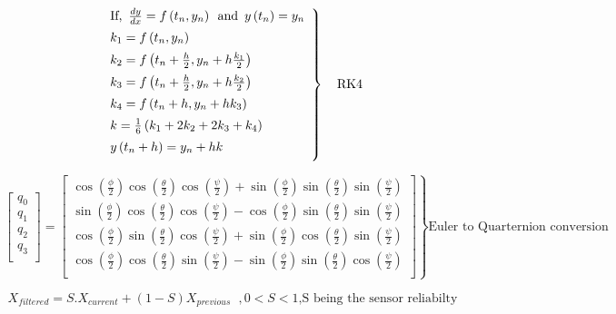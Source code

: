 \begin{equation}\label{rk4}
	\left.
	\begin{array}{lll}
		\vspace{5pt}\text{If,}\hspace{5pt}\frac{dy}{dx} = f\left(t_n,y_n\right)\hspace{5pt}\text{and}\hspace{5pt}y\left(t_n\right) = y_n\\
		\vspace{5pt}k_1 = f\left(t_n,y_n\right)\\
		\vspace{5pt}k_2 = f\left(t_n + \frac{h}{2},y_n + h\frac{k_1}{2}\right)\\
		\vspace{5pt}k_3 = f\left(t_n + \frac{h}{2},y_n + h\frac{k_2}{2}\right)\\
		\vspace{5pt}k_4 = f\left(t_n + h,y_n + hk_3\right)\\
		\vspace{5pt}k = \frac{1}{6}\left(k_1 + 2k_2 + 2k_3 + k_4\right)\\
		\vspace{5pt}y\left(t_n + h\right) = y_n + hk\\
	\end{array}
	\right \} \hspace{10pt}\text{RK4}
\end{equation}

\begin{equation}\label{euler2quart}
	\left.
	\begin{bmatrix}
		q_0\\
		q_1\\
		q_2\\
		q_3\\
	\end{bmatrix}
	= \begin{bmatrix}
		\cos\left(\frac{\phi}{2}\right)\cos\left(\frac{\theta}{2}\right)\cos\left(\frac{\psi}{2}\right)+\sin\left(\frac{\phi}{2}\right)\sin\left(\frac{\theta}{2}\right)\sin\left(\frac{\psi}{2}\right)\\
		\sin\left(\frac{\phi}{2}\right)\cos\left(\frac{\theta}{2}\right)\cos\left(\frac{\psi}{2}\right)-\cos\left(\frac{\phi}{2}\right)\sin\left(\frac{\theta}{2}\right)\sin\left(\frac{\psi}{2}\right)\\
		\cos\left(\frac{\phi}{2}\right)\sin\left(\frac{\theta}{2}\right)\cos\left(\frac{\psi}{2}\right)+\sin\left(\frac{\phi}{2}\right)\cos\left(\frac{\theta}{2}\right)\sin\left(\frac{\psi}{2}\right)\\
		\cos\left(\frac{\phi}{2}\right)\cos\left(\frac{\theta}{2}\right)\sin\left(\frac{\psi}{2}\right)-\sin\left(\frac{\phi}{2}\right)\sin\left(\frac{\theta}{2}\right)\cos\left(\frac{\psi}{2}\right)\\
	\end{bmatrix}
	\right \}\text{Euler to Quarternion conversion}
\end{equation}

\begin{equation}\label{filter}
	X_{filtered} = S.X_{current} + \left(1-S\right)X_{previous} \hspace{7pt},
	0 < S < 1\text{,S being the sensor reliabilty}
\end{equation}